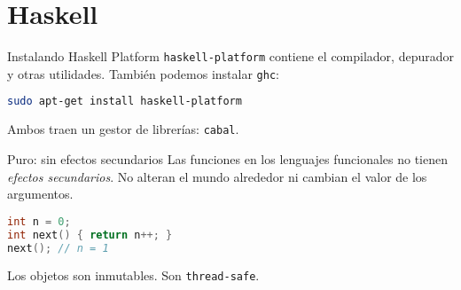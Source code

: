 \section{Haskell}

\begin{frame}[fragile]{Instalando Haskell Platform}
  \texttt{haskell-platform} contiene el compilador, depurador y otras utilidades.
  También podemos instalar \texttt{ghc}:
  \espacio
  \begin{lstlisting}[language=bash]
sudo apt-get install haskell-platform
  \end{lstlisting}
  \espacio
  Ambos traen un gestor de librerías: \texttt{cabal}.

\end{frame}

\begin{frame}[fragile]{Puro: sin efectos secundarios}
    Las funciones en los lenguajes funcionales no tienen \textit{efectos secundarios}.
    No alteran el mundo alrededor ni cambian el valor de los argumentos.
    \espacio
  \begin{lstlisting}[language=C++]
int n = 0;
int next() { return n++; }
next(); // n = 1
  \end{lstlisting}
    \espacio
  
    Los objetos son inmutables. Son \texttt{thread-safe}.

\end{frame}

